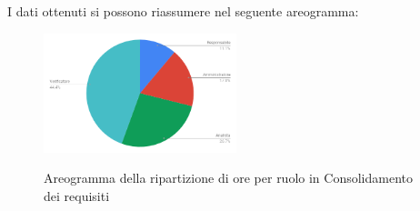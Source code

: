 I dati ottenuti si possono riassumere nel seguente areogramma:
\begin{figure}[H] 
			\centering 
				\includegraphics[width=0.5\textwidth]{res/images/areogramma_consolidamento.png}\\
				\caption{Areogramma della ripartizione di ore per ruolo in Consolidamento dei requisiti}
			\label{AreogrammaConsolidaemnto}
\end{figure}

